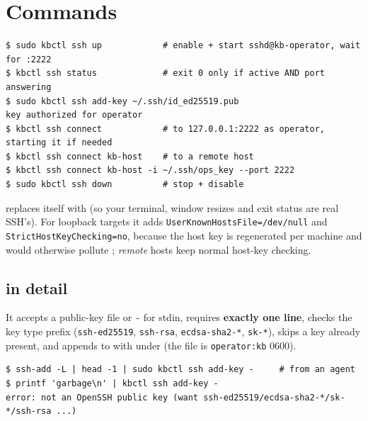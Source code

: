 \section{Commands}
\begin{lstlisting}[style=console]
$ sudo kbctl ssh up            # enable + start sshd@kb-operator, wait for :2222
$ kbctl ssh status             # exit 0 only if active AND port answering
$ sudo kbctl ssh add-key ~/.ssh/id_ed25519.pub
key authorized for operator
$ kbctl ssh connect            # to 127.0.0.1:2222 as operator, starting it if needed
$ kbctl ssh connect kb-host    # to a remote host
$ kbctl ssh connect kb-host -i ~/.ssh/ops_key --port 2222
$ sudo kbctl ssh down          # stop + disable
\end{lstlisting}
 replaces itself with  (so your terminal, window resizes and exit status are
real SSH's). For loopback targets it adds \texttt{UserKnownHostsFile=/dev/null} and
\texttt{StrictHostKeyChecking=no}, because the host key is regenerated per machine and would otherwise
pollute ; \emph{remote} hosts keep normal host-key checking.

\subsection{ in detail}
It accepts a public-key file or \texttt{-} for stdin, requires \textbf{exactly one line}, checks the key type
prefix (\texttt{ssh-ed25519}, \texttt{ssh-rsa}, \texttt{ecdsa-sha2-*}, \texttt{sk-*}), skips a key already present,
and appends to  with  under  (the file is \texttt{operator:kb} 0600).
\begin{lstlisting}[style=console]
$ ssh-add -L | head -1 | sudo kbctl ssh add-key -     # from an agent
$ printf 'garbage\n' | kbctl ssh add-key -
error: not an OpenSSH public key (want ssh-ed25519/ecdsa-sha2-*/sk-*/ssh-rsa ...)
\end{lstlisting}

